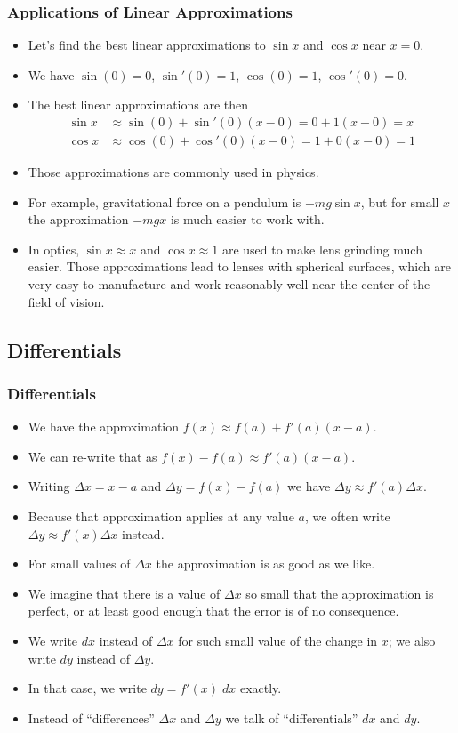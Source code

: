 \documentclass[serif,ignorenonframetext]{beamer}
\begin{document}
\begin{frame}
  \frametitle{Applications of Linear Approximations}
  \begin{itemize}[<+->]
  \item Let's find the best linear approximations to $\sin x$ and
    $\cos x$ near $x=0$.
  \item We have $\sin(0)=0$, $\sin'(0)=1$, $\cos(0)=1$, $\cos'(0)=0$.
  \item The best linear approximations are then
    \begin{align*}
      \sin x &\approx \sin(0) + \sin'(0) (x-0) = 0 + 1(x-0) = x \\
      \cos x &\approx \cos(0) + \cos'(0) (x-0) = 1 + 0(x-0) = 1
    \end{align*}
  \item Those approximations are commonly used in physics.
  \item For example, gravitational force on a pendulum is $-mg \sin x$,
    but for small $x$ the approximation $-mg x$ is much easier to work
    with.
  \item In optics, $\sin x \approx x$
    and $\cos x \approx 1$ are used to make lens grinding much easier.
    Those approximations lead to lenses with spherical surfaces, 
    which are very easy to manufacture and work reasonably well
    near the center of the field of vision.
  \end{itemize}
\end{frame}


\subsection{Differentials}

\begin{frame}
  \frametitle{Differentials}
  \begin{itemize}[<+->]
  \item We have the approximation $f(x) \approx f(a) + f'(a)(x-a)$.
  \item We can re-write that as $f(x)-f(a) \approx f'(a) (x-a)$.
  \item Writing $\Delta x = x-a$ and $\Delta y = f(x)-f(a)$ we have
    $\Delta y \approx f'(a) \Delta x$.
  \item Because that approximation applies at any value $a$, we often
    write $\Delta y \approx f'(x) \Delta x$ instead.
  \item For small values of $\Delta x$ the approximation
    is as good as we like.
  \item We imagine that there is a value of $\Delta x$ so small that
    the approximation is perfect, or at least good enough that the
    error is of no consequence.
  \item We write $dx$ instead of $\Delta x$ for such small value of
    the change in $x$; we also write $dy$ instead of $\Delta y$.
  \item In that case, we write $dy = f'(x) \; dx$ exactly.
  \item Instead of ``differences'' $\Delta x$ and $\Delta y$ we talk
    of ``differentials'' $dx$ and $dy$.
  \end{itemize}
\end{frame}
\end{document}
